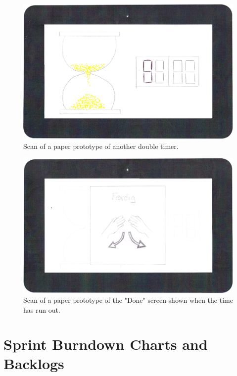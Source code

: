 	\begin{figure}[H]
		\centering
			\includegraphics[width=\textwidth]{Images/paper_prototype/timer_3.png}
				\caption{Scan of a paper prototype of another double timer.}
		\label{fig:pap_prot_timedoub2}
	\end{figure}

	\begin{figure}[H]
		\centering
			\includegraphics[width=\textwidth]{Images/paper_prototype/done.png}
				\caption{Scan of a paper prototype of the "Done" screen shown when the time has run out.}
		\label{fig:pap_prot_donescr}
	\end{figure}

\section{Sprint Burndown Charts and Backlogs}
\label{sec:burn_back}

